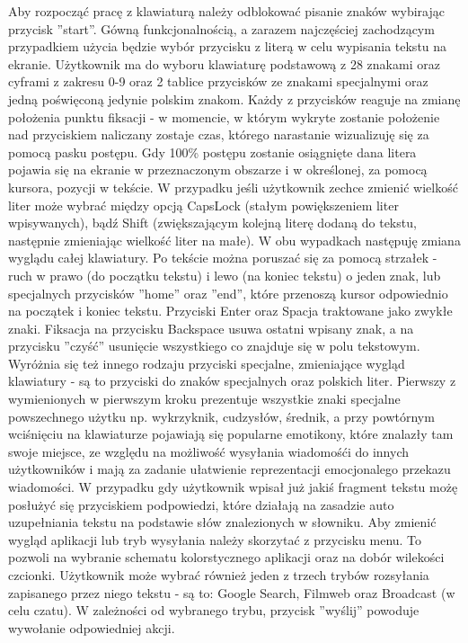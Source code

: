 \documentclass[twoside,a4paper]{book}
\begin{document}
Aby rozpocząć pracę z klawiaturą należy odblokować pisanie znaków wybirając przycisk ''start''.
Gówną funkcjonalnością, a zarazem najczęściej zachodzącym przypadkiem użycia będzie wybór przycisku z literą w celu wypisania tekstu na ekranie. Użytkownik ma do wyboru klawiaturę podstawową z 28 znakami oraz cyframi z zakresu 0-9 oraz 2 tablice przycisków ze znakami specjalnymi oraz jedną poświęconą jedynie polskim znakom. Każdy z przycisków reaguje na zmianę położenia punktu fiksacji - w momencie, w którym wykryte zostanie położenie nad przyciskiem naliczany zostaje czas, którego narastanie wizualizuję się za pomocą pasku postępu. Gdy 100\% postępu zostanie osiągnięte dana litera pojawia się na ekranie w przeznaczonym obszarze i w określonej, za pomocą kursora, pozycji w tekście. W przypadku jeśli użytkownik zechce zmienić wielkość liter może wybrać między opcją CapsLock (stałym powiększeniem liter wpisywanych), bądź Shift (zwiększającym kolejną literę dodaną do tekstu, następnie zmieniając wielkość liter na małe). W obu wypadkach następuję zmiana wyglądu całej klawiatury. 
Po tekście można poruszać się za pomocą strzałek - ruch w prawo (do początku tekstu) i lewo (na koniec tekstu) o jeden znak, lub specjalnych przycisków ''home'' oraz ''end'', które przenoszą kursor odpowiednio na początek i koniec tekstu. Przyciski Enter oraz Spacja traktowane jako zwykłe znaki. Fiksacja na przycisku Backspace usuwa ostatni wpisany znak, a   na przycisku ''czyść'' usunięcie wszystkiego co znajduje się w polu tekstowym. Wyróżnia się też innego rodzaju przyciski specjalne, zmieniające wygląd klawiatury - są to przyciski do znaków specjalnych oraz polskich liter. Pierwszy z wymienionych w pierwszym kroku prezentuje wszystkie znaki specjalne powszechnego użytku np. wykrzyknik, cudzysłów, średnik, a przy powtórnym wciśnięciu na klawiaturze pojawiają się popularne emotikony, które znalazły tam swoje miejsce, ze względu na możliwość wysyłania wiadomośći do innych użytkowników i mają za zadanie ułatwienie reprezentacji emocjonalego przekazu wiadomości. W przypadku gdy użytkownik wpisał już jakiś fragment tekstu możę posłużyć się przyciskiem podpowiedzi, które działają na zasadzie auto uzupełniania tekstu na podstawie słów znalezionych w słowniku. Aby zmienić wygląd aplikacji lub tryb wysyłania należy skorzytać z przycisku menu. To pozwoli na wybranie schematu kolorstycznego aplikacji oraz na dobór wilekości czcionki. Użytkownik może wybrać również jeden z trzech trybów rozsyłania zapisanego przez niego tekstu - są to: Google Search, Filmweb oraz Broadcast (w celu czatu). W zależności od wybranego trybu, przycisk ''wyślij'' powoduje wywołanie odpowiedniej akcji.
\end{document}
